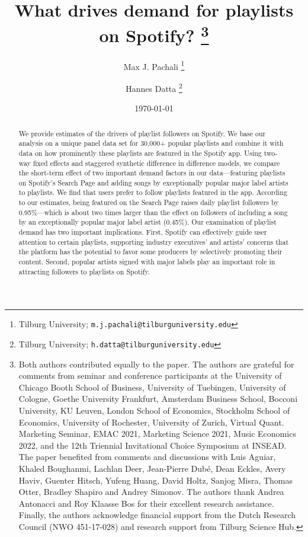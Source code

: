 \documentclass[12pt, a4paper, leqno]{article}
\begin{document}
\begin{titlepage}
\title{
%
\vspace{-1.5cm}
%
What drives demand for playlists on Spotify? 
\thanks{Both authors contributed equally to the paper. The authors are grateful for comments from seminar and conference participants at the University of Chicago Booth School of Business, University of Tuebingen, University of Cologne, Goethe University Frankfurt, Amsterdam Business School, Bocconi University, KU Leuven, London School of Economics, Stockholm School of Economics, University of Rochester, University of Zurich, Virtual Quant. Marketing Seminar, EMAC 2021, Marketing Science 2021, Music Economics 2022, and the 12th Triennial Invitational Choice Symposium at INSEAD. The paper benefited from comments and discussions with Luis Aguiar, Khaled Boughanmi, Lachlan Deer, Jean-Pierre Dub\'e, Dean Eckles, Avery Haviv, Guenter Hitsch, Yufeng Huang, David Holtz, Sanjog Misra, Thomas Otter, Bradley Shapiro and Andrey Simonov. 
The authors thank Andrea Antonacci and Roy Klaasse Bos for their excellent research assistance. Finally, the authors acknowledge financial support from the Dutch Research Council (NWO 451-17-028) and research support from Tilburg Science Hub.}
}

\author{
Max J. Pachali
\thanks{Tilburg University; \texttt{m.j.pachali@tilburguniversity.edu}}
\and 
Hannes Datta
\thanks{Tilburg University; \texttt{h.datta@tilburguniversity.edu}}}
\date{\today}
\maketitle
\begin{abstract}

We provide estimates of the drivers of playlist followers on Spotify. We base our analysis on a unique panel data set for 30,000+ popular playlists and combine it with data on how prominently these playlists are featured in the Spotify app. Using two-way fixed effects and staggered synthetic difference in difference models, we compare the short-term effect of two important demand factors in our data---featuring playlists on Spotify's Search Page and adding songs by exceptionally popular major label artists to playlists. We find that users prefer to follow playlists featured in the app. According to our estimates, being featured on the Search Page raises daily playlist followers by 0.95\%---which is about two times larger than the effect on followers of including a song by an exceptionally popular major label artist (0.45\%). Our examination of playlist demand has two important implications. First, Spotify can effectively guide user attention to certain playlists, supporting industry executives' and artists' concerns that the platform has the potential to favor some producers by selectively promoting their content. Second, popular artists signed with major labels play an important role in attracting followers to playlists on Spotify.


\end{abstract}
\end{titlepage}
\end{document}
